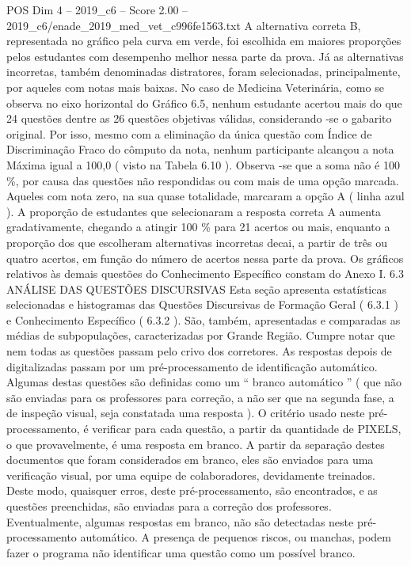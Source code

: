 \begin{textsample}{POS Dim 4 – 2019\_c6 – Score 2.00 – 2019\_c6/enade\_2019\_med\_vet\_c996fe1563.txt}
A alternativa correta B, representada no gráfico pela curva em verde, foi escolhida em maiores proporções pelos estudantes com desempenho melhor nessa parte da prova.
Já as alternativas incorretas, também denominadas distratores, foram selecionadas, principalmente, por aqueles com notas mais baixas.
No caso de Medicina Veterinária, como se observa no eixo horizontal do Gráfico 6.5, nenhum estudante acertou mais do que 24 questões dentre as 26 questões objetivas válidas, considerando -se o gabarito original.
Por isso, mesmo com a eliminação da única questão com Índice de Discriminação Fraco do cômputo da nota, nenhum participante alcançou a nota Máxima igual a 100,0 ( visto na Tabela 6.10 ).
Observa -se que a soma não é 100 \%, por causa das questões não respondidas ou com mais de uma opção marcada.
Aqueles com nota zero, na sua quase totalidade, marcaram a opção A ( linha azul ).
A proporção de estudantes que selecionaram a resposta correta A aumenta gradativamente, chegando a atingir 100 \% para 21 acertos ou mais, enquanto a proporção dos que escolheram alternativas incorretas decai, a partir de três ou quatro acertos, em função do número de acertos nessa parte da prova.
Os gráficos relativos às demais questões do Conhecimento Específico constam do Anexo I. 6.3 ANÁLISE DAS QUESTÕES DISCURSIVAS Esta seção apresenta estatísticas selecionadas e histogramas das Questões Discursivas de Formação Geral ( 6.3.1 ) e Conhecimento Específico ( 6.3.2 ).
São, também, apresentadas e comparadas as médias de subpopulações, caracterizadas por Grande Região.
Cumpre notar que nem todas as questões passam pelo crivo dos corretores.
As respostas depois de digitalizadas passam por um pré-processamento de identificação automático.
Algumas destas questões são definidas como um “ branco automático ” ( que não são enviadas para os professores para correção, a não ser que na segunda fase, a de inspeção visual, seja constatada uma resposta ).
O critério usado neste pré-processamento, é verificar para cada questão, a partir da quantidade de PIXELS, o que provavelmente, é uma resposta em branco.
A partir da separação destes documentos que foram considerados em branco, eles são enviados para uma verificação visual, por uma equipe de colaboradores, devidamente treinados.
Deste modo, quaisquer erros, deste pré-processamento, são encontrados, e as questões preenchidas, são enviadas para a correção dos professores.
Eventualmente, algumas respostas em branco, não são detectadas neste pré-processamento automático.
A presença de pequenos riscos, ou manchas, podem fazer o programa não identificar uma questão como um possível branco.

\end{textsample}
